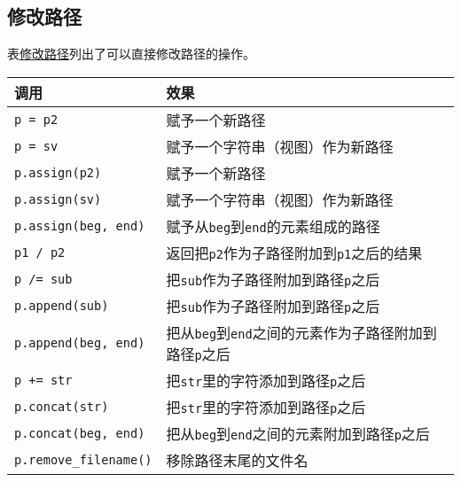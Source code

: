 \subsection{修改路径}\label{ch20.3.5}
表\hyperref[t20.7]{修改路径}列出了可以直接修改路径的操作。
\begin{table}[htb]
    \centering
    \begin{tabular}{l|l}
        \hline
        \textbf{调用}                         & \textbf{效果}                                            \\
        \hline
        \texttt{p = p2}                     & 赋予一个新路径                                                \\
        \texttt{p = sv}                     & 赋予一个字符串（视图）作为新路径                                       \\
        \texttt{p.assign(p2)}               & 赋予一个新路径                                                \\
        \texttt{p.assign(sv)}               & 赋予一个字符串（视图）作为新路径                                       \\
        \texttt{p.assign(beg, end)}         & 赋予从\texttt{beg}到\texttt{end}的元素组成的路径                   \\
        \texttt{p1 / p2}                    & 返回把\texttt{p2}作为子路径附加到\texttt{p1}之后的结果                 \\
        \texttt{p /= sub}                   & 把\texttt{sub}作为子路径附加到路径\texttt{p}之后                    \\
        \texttt{p.append(sub)}              & 把\texttt{sub}作为子路径附加到路径\texttt{p}之后                    \\
        \texttt{p.append(beg, end)}         & 把从\texttt{beg}到\texttt{end}之间的元素作为子路径附加到路径\texttt{p}之后 \\
        \texttt{p += str}                   & 把\texttt{str}里的字符添加到路径\texttt{p}之后                     \\
        \texttt{p.concat(str)}              & 把\texttt{str}里的字符添加到路径\texttt{p}之后                     \\
        \texttt{p.concat(beg, end)}         & 把从\texttt{beg}到\texttt{end}之间的元素附加到路径\texttt{p}之后      \\
        \texttt{p.remove\_filename()}       & 移除路径末尾的文件名                                             \\

\end{tabular}
\end{table}
